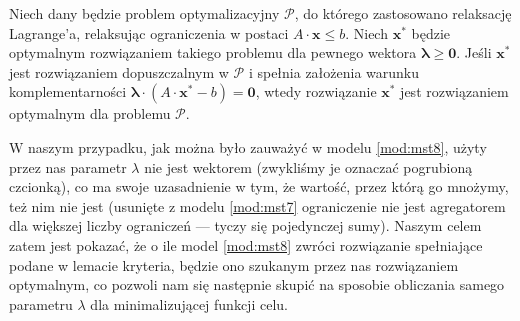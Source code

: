 \begin{lemma}
	Niech dany będzie problem optymalizacyjny $\mathcal{P}$, do którego zastosowano relaksację Lagrange'a, relaksując ograniczenia w postaci $A \cdot \textbf{x} \leqslant b$. Niech $\textbf{x}^{\ast}$ będzie optymalnym rozwiązaniem takiego problemu dla pewnego wektora $\boldsymbol{\lambda} \geqslant \textbf{0}$. Jeśli $\textbf{x}^{\ast}$ jest rozwiązaniem dopuszczalnym w $\mathcal{P}$ i spełnia założenia warunku komplementarności $\boldsymbol{\lambda} \cdot \left( A \cdot \textbf{x}^{\ast} - b \right) = \textbf{0}$, wtedy rozwiązanie $\textbf{x}^{\ast}$ jest rozwiązaniem optymalnym dla problemu $\mathcal{P}$.
\end{lemma}

W naszym przypadku, jak można było zauważyć w modelu \ref{mod:mst8}, użyty przez nas parametr $\lambda$ nie jest wektorem (zwykliśmy je oznaczać pogrubioną czcionką), co ma swoje uzasadnienie w tym, że wartość, przez którą go mnożymy, też nim nie jest (usunięte z modelu \ref{mod:mst7} ograniczenie nie jest agregatorem dla większej liczby ograniczeń --- tyczy się pojedynczej sumy). Naszym celem zatem jest pokazać, że o ile model \ref{mod:mst8} zwróci rozwiązanie spełniające podane w lemacie kryteria, będzie ono szukanym przez nas rozwiązaniem optymalnym, co pozwoli nam się następnie skupić na sposobie obliczania samego parametru $\lambda$ dla minimalizującej funkcji celu.

